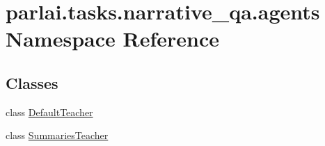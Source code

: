 \hypertarget{namespaceparlai_1_1tasks_1_1narrative__qa_1_1agents}{}\section{parlai.\+tasks.\+narrative\+\_\+qa.\+agents Namespace Reference}
\label{namespaceparlai_1_1tasks_1_1narrative__qa_1_1agents}
\subsection*{Classes}
\begin{DoxyCompactItemize}
\item 
class \hyperlink{classparlai_1_1tasks_1_1narrative__qa_1_1agents_1_1DefaultTeacher}{Default\+Teacher}
\item 
class \hyperlink{classparlai_1_1tasks_1_1narrative__qa_1_1agents_1_1SummariesTeacher}{Summaries\+Teacher}
\end{DoxyCompactItemize}
